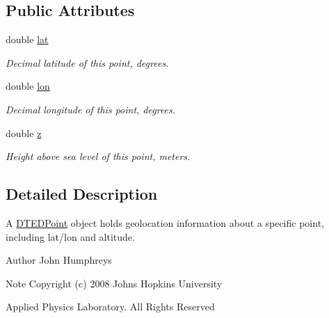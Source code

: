 \subsection*{Public Attributes}
\begin{DoxyCompactItemize}
\item 
\hypertarget{class_d_t_e_d_point_a237ae93e1d0a6c7e9b598f1ffd192ec1}{
double \hyperlink{class_d_t_e_d_point_a237ae93e1d0a6c7e9b598f1ffd192ec1}{lat}}
\label{class_d_t_e_d_point_a237ae93e1d0a6c7e9b598f1ffd192ec1}

\begin{DoxyCompactList}\small\item\em Decimal latitude of this point, degrees. \end{DoxyCompactList}\item 
\hypertarget{class_d_t_e_d_point_a35cdbc1f455740bb7320255f85e44cf9}{
double \hyperlink{class_d_t_e_d_point_a35cdbc1f455740bb7320255f85e44cf9}{lon}}
\label{class_d_t_e_d_point_a35cdbc1f455740bb7320255f85e44cf9}

\begin{DoxyCompactList}\small\item\em Decimal longitude of this point, degrees. \end{DoxyCompactList}\item 
\hypertarget{class_d_t_e_d_point_ae1e4f43de7a7a01597012d707968ac45}{
double \hyperlink{class_d_t_e_d_point_ae1e4f43de7a7a01597012d707968ac45}{z}}
\label{class_d_t_e_d_point_ae1e4f43de7a7a01597012d707968ac45}

\begin{DoxyCompactList}\small\item\em Height above sea level of this point, meters. \end{DoxyCompactList}\end{DoxyCompactItemize}


\subsection{Detailed Description}
A \hyperlink{class_d_t_e_d_point}{DTEDPoint} object holds geolocation information about a specific point, including lat/lon and altitude. 

\begin{DoxyAuthor}{Author}
John Humphreys
\end{DoxyAuthor}
\begin{DoxyNote}{Note}
Copyright (c) 2008 Johns Hopkins University 

Applied Physics Laboratory. All Rights Reserved 
\end{DoxyNote}


